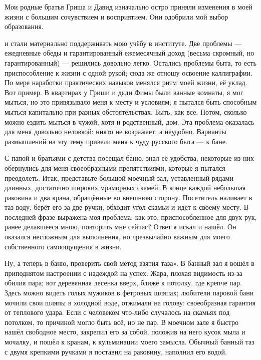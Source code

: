 
\label{277-2}
Мои родные братья Гриша и Давид изначально остро приняли изменения в моей жизни с большим сочувствием и восприятием. Они одобрили мой выбор образования.

\label{278-1}
и стали материально поддерживать мою учёбу в институте.
Две проблемы — ежедневные обеды и гарантированный ежемесячный доход (весьма скромный, но гарантированный) — решились довольно легко. Остались проблемы быта, то есть приспособление к жизни с одной рукой; сюда же отношу освоение каллиграфии.
По мере наработки практических навыков менялся ритм моей жизни, её уклад. Вот пример. В квартирах у Гриши и дяди Фимы были ванные комнаты, я мог мыться, но это привязывало меня к месту и условиям; я пытался быть способным мыться капитально при разных обстоятельствах. Быть, как все. Потом, сколько можно ездить мыться в чужой, хотя и родственный, дом. Эта проблема оказалась для меня довольно неловкой: никто не возражает, а неудобно. Варианты размышлений на эту тему привели меня к чуду русского быта — к бане.

\label{279-1}
С папой и братьями с детства посещал баню, знал её удобства, некоторые из них обернулись для меня своеобразными препятствиями, которые я пытался преодолеть. Итак, представьте большой моечный зал, уставленный рядами длинных, достаточно широких мраморных скамей. В конце каждой небольшая раковина и два крана, обращённые во внешнюю сторону. Посетитель наливает в таз воду, берёт его за две ручки, обходит угол скамьи и идёт к своему месту. В последней фразе выражена моя проблема: как это, приспособленное для двух рук, ранее делавшееся мною, повторить мне сейчас? Ответ я искал и нашёл. Он оказался несложным для выполнения, но чрезвычайно важным для моего собственного самоощущения в жизни.

\label{280-1}
Ну, а теперь в баню, проверить свой метод взятия таза». В банный зал я вошёл в приподнятом настроении с надеждой на успех. Жара, плохая видимость из-за обилия пара; вот деревянная лесенка вверх, ближе к потолку, где крепче пар. Здесь можно видеть голых мужиков в фетровых шляпах; любители паровой бани мочили свои шляпы в холодной воде, отжимали на голову: своеобразная гарантия от теплового удара. Если с человеком что-либо случалось на скамьях под потолком, то причиной могло быть всё, но не пар. В моечном зале я быстро нашёл свободное место, закрепил его за собой, положив на него кусок мыла и мочалку, и пошёл к кранам, к кульминации моего замысла. Обычный банный таз с двумя крепкими ручками я поставил на раковину, наполнил его водой.

